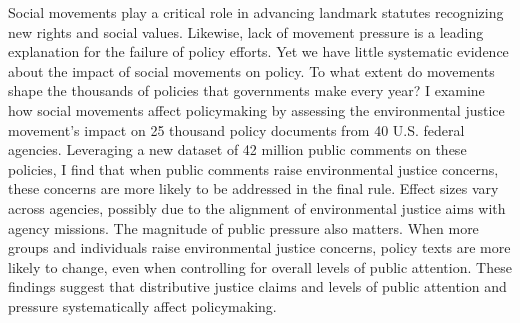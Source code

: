 Social movements play a critical role in advancing landmark statutes recognizing new rights and social values. Likewise, lack of movement pressure is a leading explanation for the failure of policy efforts. Yet we have little systematic evidence about the impact of social movements on policy. To what extent do movements shape the thousands of policies that governments make every year? I examine how social movements affect policymaking by assessing the environmental justice movement's impact on 25 thousand policy documents from 40 U.S. federal agencies.  Leveraging a new dataset of 42 million public comments on these policies, I find that when public comments raise environmental justice concerns, these concerns are more likely to be addressed in the final rule. Effect sizes vary across agencies, possibly due to the alignment of environmental justice aims with agency missions.
The magnitude of public pressure also matters. When more groups and individuals raise environmental justice concerns, policy texts are more likely to change, even when controlling for overall levels of public attention. These findings suggest that distributive justice claims and levels of public attention and pressure systematically affect policymaking.
